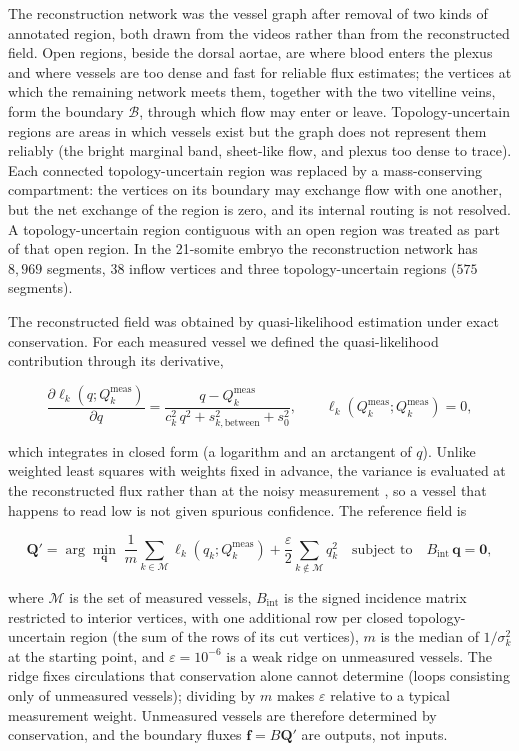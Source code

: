 The reconstruction network was the vessel graph after removal of two kinds of annotated region, both drawn from the
videos rather than from the reconstructed field. Open regions, beside the dorsal aortae, are where blood enters the plexus
and where vessels are too dense and fast for reliable flux estimates; the vertices at which the remaining network meets
them, together with the two vitelline veins, form the boundary $\mathcal B$, through which flow may enter or leave.
Topology-uncertain regions are areas in which vessels exist but the graph does not represent them reliably (the bright
marginal band, sheet-like flow, and plexus too dense to trace). Each connected topology-uncertain region was replaced by a
mass-conserving compartment: the vertices on its boundary may exchange flow with one another, but the net exchange of the
region is zero, and its internal routing is not resolved. A topology-uncertain region contiguous with an open region was
treated as part of that open region. In the 21-somite embryo the reconstruction network has $8{,}969$ segments,
$38$ inflow vertices and three topology-uncertain regions ($575$ segments).

The reconstructed field was obtained by quasi-likelihood estimation under exact conservation. For each measured vessel
we defined the quasi-likelihood contribution through its derivative,

\begin{equation}
\frac{\partial \ell_k(q;Q_k^{\mathrm{meas}})}{\partial q}
=
\frac{q-Q_k^{\mathrm{meas}}}{c_k^2\,q^2+s_{k,\mathrm{between}}^2+s_0^2},
\qquad
\ell_k(Q_k^{\mathrm{meas}};Q_k^{\mathrm{meas}})=0,
\label{eq:quasi_likelihood}
\end{equation}

which integrates in closed form (a logarithm and an arctangent of $q$). Unlike weighted least squares with weights
fixed in advance, the variance is evaluated at the reconstructed flux rather than at the noisy measurement
\citep{Wedderburn1974}, so a vessel that happens to read low is not given spurious confidence. The reference field is

\begin{equation}
\mathbf Q'
=
\arg\min_{\mathbf q}
\;\frac1m\sum_{k\in\mathcal M}\ell_k(q_k;Q_k^{\mathrm{meas}})
+\frac{\varepsilon}{2}\sum_{k\notin\mathcal M}q_k^2
\quad\text{subject to}\quad
B_{\mathrm{int}}\,\mathbf q=\mathbf 0,
\label{eq:reconstruction}
\end{equation}

where $\mathcal M$ is the set of measured vessels, $B_{\mathrm{int}}$ is the signed incidence matrix restricted to
interior vertices, with one additional row per closed topology-uncertain region (the sum of the rows of its cut vertices),
$m$ is the median of
$1/\sigma_k^2$ at the starting point, and $\varepsilon=10^{-6}$ is a weak ridge on unmeasured vessels. The ridge fixes
circulations that conservation alone cannot determine (loops consisting only of unmeasured vessels); dividing by $m$
makes $\varepsilon$ relative to a typical measurement weight. Unmeasured vessels are therefore determined by
conservation, and the boundary fluxes $\mathbf f=B\mathbf Q'$ are outputs, not inputs.

